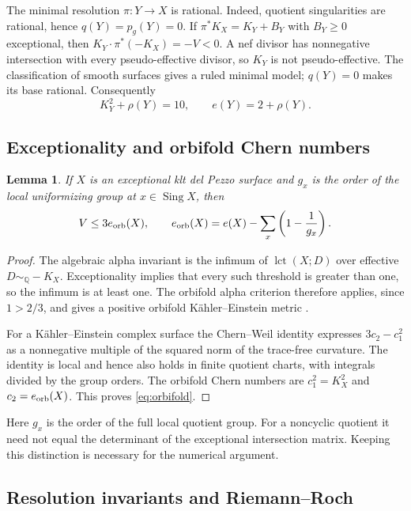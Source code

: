 \documentclass[12pt,a4paper]{article}
\numberwithin{equation}{section}
\newtheorem{lemma}[theorem]{Lemma}
\theoremstyle{definition}
\newcommand{\Q}{\mathbb Q}
\begin{document}
The minimal resolution \(\pi:Y\to X\) is rational.
Indeed, quotient singularities are rational, hence
\(q(Y)=p_g(Y)=0\). If
\(\pi^*K_X=K_Y+B_Y\) with \(B_Y\geq0\) exceptional, then
\(K_Y\cdot\pi^*(-K_X)=-V<0\). A nef divisor has nonnegative
intersection with every pseudo-effective divisor, so \(K_Y\) is
not pseudo-effective. The classification of smooth surfaces gives a
ruled minimal model; \(q(Y)=0\) makes its base rational.
Consequently
\[
                       K_Y^2+\rho(Y)=10,\qquad e(Y)=2+\rho(Y).
\]

\subsection{Exceptionality and orbifold Chern numbers}

\begin{lemma}\label{lem:orbifold}
If \(X\) is an exceptional klt del Pezzo surface and \(g_x\) is the
order of the local uniformizing group at \(x\in\operatorname{Sing}X\),
then
\begin{equation}\label{eq:orbifold}
 V\leq3e_{\rm orb}(X),\qquad
 e_{\rm orb}(X)=e(X)-\sum_x\left(1-\frac1{g_x}\right).
\end{equation}
\end{lemma}

\begin{proof}
The algebraic alpha invariant is the infimum of
\(\operatorname{lct}(X;D)\) over effective \(D\sim_{\Q}-K_X\).
Exceptionality implies that every such threshold is greater than one,
so the infimum is at least one. The orbifold alpha criterion therefore
applies, since \(1>2/3\), and gives a positive orbifold
K\"ahler--Einstein metric
\cite[Section 6, Criterion 6.4]{DK01}.

For a K\"ahler--Einstein complex surface the Chern--Weil identity
expresses \(3c_2-c_1^2\) as a nonnegative multiple of the squared norm
of the trace-free curvature. The identity is local and hence also
holds in finite quotient charts, with integrals divided by the group
orders. The orbifold Chern numbers are \(c_1^2=K_X^2\) and
\(c_2=e_{\rm orb}(X)\). This proves \eqref{eq:orbifold}.
\end{proof}

Here \(g_x\) is the order of the full local quotient group.
For a noncyclic quotient it need not equal the determinant of the
exceptional intersection matrix. Keeping this distinction is
necessary for the numerical argument.

\subsection{Resolution invariants and Riemann--Roch}
\end{document}
